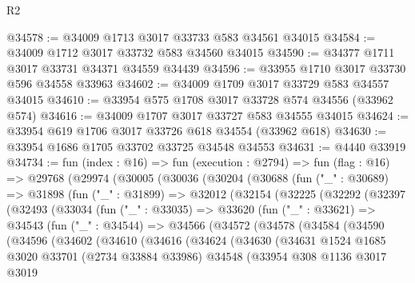 \begin{lexlean}{R2}
\begin{coremodule}
@34578 := @34009 @1713 @3017 @33733 @583 @34561 @34015
@34584 := @34009 @1712 @3017 @33732 @583 @34560 @34015
@34590 := @34377 @1711 @3017 @33731 @34371 @34559 @34439
@34596 := @33955 @1710 @3017 @33730 @596 @34558 @33963
@34602 := @34009 @1709 @3017 @33729 @583 @34557 @34015
@34610 := @33954 @575 @1708 @3017 @33728 @574 @34556 (@33962 @574)
@34616 := @34009 @1707 @3017 @33727 @583 @34555 @34015
@34624 := @33954 @619 @1706 @3017 @33726 @618 @34554 (@33962 @618)
@34630 := @33954 @1686 @1705 @33702 @33725 @34548 @34553
@34631 := @4440 @33919
@34734 := fun (index : @16) =>
  fun (execution : @2794) =>
  fun (flag : @16) =>
  @29768
    (@29974
      (@30005
        (@30036
          (@30204
            (@30688
              (fun ("_" : @30689) =>
              @31898
                (fun ("_" : @31899) =>
                @32012
                  (@32154
                    (@32225
                      (@32292
                        (@32397
                          (@32493
                            (@33034
                              (fun ("_" : @33035) =>
                              @33620
                                (fun ("_" : @33621) =>
                                @34543
                                  (fun ("_" : @34544) =>
                                  @34566
                                    (@34572
                                      (@34578
                                        (@34584
                                          (@34590
                                            (@34596
                                              (@34602
                                                (@34610
                                                  (@34616
                                                    (@34624
                                                      (@34630
                                                        (@34631
                                                          @1524
                                                          @1685
                                                          @3020
                                                          @33701
                                                          (@2734 @33884 @33986)
                                                          @34548
                                                          (@33954
                                                            @308
                                                            @1136
                                                            @3017
                                                            @3019

\end{coremodule}
\end{lexlean}
